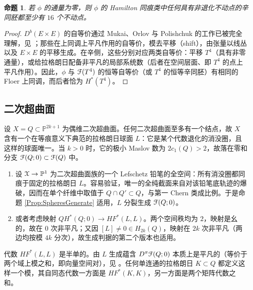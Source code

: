 \documentclass[11pt,a4paper]{article}
\numberwithin{equation}{section}
\newtheorem{Proposition}[thm]{命题}
\newcommand{\bP}{\mathbb{P}}
\newcommand{\scrX}{\EuScript{X}}
\newcommand{\scrF}{\EuScript{F}}
\begin{document}

\begin{Proposition} 若 $\phi$ 的通量为零，则 $\phi$ 的 Hamilton 同痕类中任何具有非退化不动点的辛同胚都至少有 $16$ 个不动点。\end{Proposition}

\begin{proof}
$D^b(E\times E)$ 的自等价通过 Mukai、Orlov 与 Polishchuk 的工作已被完全理解，见 \cite{Orlov:abelian, Pol:weil}；那些在上同调上平凡作用的自等价，模去平移（shift），由张量以线丛以及 $E\times E$ 的平移生成。在辛侧，这些分别对应两类自等价：平移 $T^4$（具有非零通量），或给拉格朗日配备非平凡的局部系统数（后者在空间层面、即 $T^4$ 的点上平凡作用）。因此，$\phi$ 与 $\scrF(T^4)$ 的恒等自等价（或 $T^4$ 的恒等辛同胚）有相同的 Floer 上同调，而后者恰为 $H^*(T^4)$。
\end{proof}

\subsection{二次超曲面}\label{Sec:Quadrics}

设 $X=Q \subset \bP^{2k+1}$ 为偶维二次超曲面。任何二次超曲面至多有一个结点，故 $X$ 含有一个在等痕意义下典范的拉格朗日球面 $L$：它是某个代数退化的消没圈，且这样的球面唯一。当 $k>0$ 时，它的极小 Maslov 数为 $2c_1(Q) > 2$，故落在零和分支 $\scrF(Q;0)\subset \scrF(Q)$ 中。

\begin{enumerate}
\item 设 $\scrX \rightarrow \bP^1$ 为二次超曲面族的一个 Lefschetz 铅笔的全空间：所有消没圈都同痕于固定的拉格朗日 $L$。容易验证，唯一的全纯截面来自对该铅笔底轨迹的爆破，因而在单个纤维中取值于 $Q \cap Q' \subset Q$，与第一 Chern 类成比例。于是命题 \ref{Prop:SpheresGenerate} 适用，$L$ 分裂生成 $\scrF(Q;0)$。
\item 或者考虑映射 $QH^*(Q;0) \rightarrow HF^*(L,L)$。两个空间秩均为 $2$，映射是幺的，故在 $0$ 次非平凡；又因 $[L] \neq 0 \in H_{2k}(Q)$，映射在 $2k$ 次非平凡（两边均按模 $4k$ 分次），故生成判据的第二个版本也适用。
\end{enumerate}

代数 $HF^*(L,L)$ 是半单的。由 $L$ 生成蕴含 $D^{\pi}\scrF(Q;0)$ 本质上是平凡的（等价于两个域上模之和，即向量空间对），见 \cite{Smith:HFQuadrics}。任何单连通的拉格朗日 $K \subset Q$ 都定义这样一个模，其自同态代数一方面是 $HF^*(K,K)$，另一方面是两个矩阵代数之和。
\end{document}
